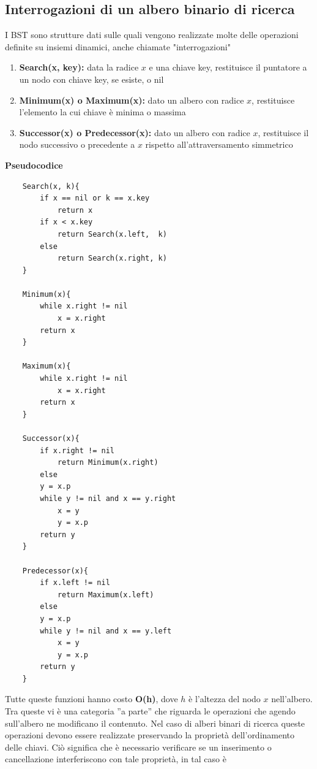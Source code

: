 \subsection{Interrogazioni di un albero binario di ricerca}
I BST sono strutture dati sulle quali vengono realizzate molte delle operazioni definite su insiemi dinamici, anche chiamate "interrogazioni"
\begin{enumerate}
    \item \textbf{Search(x, key):} data la radice $x$ e una chiave key, restituisce il puntatore a un nodo con chiave key, se esiste, o nil
    \item \textbf{Minimum(x) o Maximum(x):} dato un albero con radice $x$, restituisce l'elemento la cui chiave è minima o massima
    \item \textbf{Successor(x) o Predecessor(x):} dato un albero con radice $x$, restituisce il nodo successivo o precedente a $x$ rispetto all'attraversamento simmetrico
\end{enumerate}
\noindent \textbf{Pseudocodice} 
\begin{verbatim}
    Search(x, k){
        if x == nil or k == x.key
            return x
        if x < x.key 
            return Search(x.left,  k)
        else
            return Search(x.right, k)
    }

    Minimum(x){
        while x.right != nil
            x = x.right
        return x
    }

    Maximum(x){
        while x.right != nil
            x = x.right
        return x
    }

    Successor(x){
        if x.right != nil
            return Minimum(x.right)
        else 
        y = x.p
        while y != nil and x == y.right
            x = y
            y = x.p 
        return y
    }

    Predecessor(x){
        if x.left != nil
            return Maximum(x.left)
        else 
        y = x.p
        while y != nil and x == y.left
            x = y
            y = x.p 
        return y
    }
\end{verbatim}
\noindent Tutte queste funzioni hanno costo \textbf{O(h)}, dove $h$ è l'altezza del nodo $x$ nell'albero.  \medskip\\
Tra queste vi è una categoria ”a parte” che riguarda le operazioni che agendo sull’albero ne
modificano il contenuto. Nel caso di alberi binari di ricerca queste operazioni devono essere
realizzate preservando la proprietà dell’ordinamento delle chiavi. Ciò significa che è necessario
 verificare se un inserimento o cancellazione interferiscono con tale proprietà, in tal caso è
